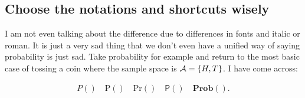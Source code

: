 \documentclass[aos,preprint]{imsart}
\begin{document}
\subsection{Choose the notations and shortcuts wisely}

I am not even talking about the difference due to differences in fonts and italic or roman.
It is just a very sad thing that we don't even have a unified way of saying probability is just sad.
Take probability for example and return to the most basic case of tossing a
coin
where the sample space is $\mathcal{A} = \{H, T\}$. I have come across:

\begin{align*}
	P() \quad \mathrm{P}() \quad \mathrm{Pr}() \quad \mathsf{P}() \quad
	\mathbf{Prob}().
\end{align*}
\end{document}
